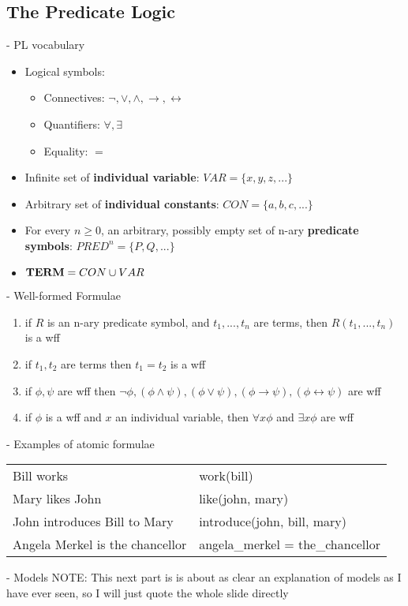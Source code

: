 \documentclass[11pt]{article}
\newenvironment{itemise}{
\begin{itemize}
  \setlength{\itemsep}{1pt}
  \setlength{\parskip}{0pt}
  \setlength{\parsep}{0pt}
}{\end{itemize}}
\begin{document}
\subsection{The Predicate Logic}
- PL vocabulary
\begin{itemise}
 \item Logical symbols:
\begin{itemise}
 \item Connectives: $\neg, \vee, \wedge, \rightarrow, \leftrightarrow$
 \item Quantifiers: $\forall, \exists$
 \item Equality: $=$
\end{itemise}
 \item Infinite set of {\bf individual variable}: $VAR = \{x, y, z, ...\}$
 \item Arbitrary set of {\bf individual constants}: $CON = \{a, b, c,...\}$
 \item For every $n \geq 0$, an arbitrary, possibly empty set of n-ary {\bf predicate symbols}: $PRED^n = \{P, Q, ...\}$ 
 \item ${\bf TERM} = CON \cup VAR$
\end{itemise}
- Well-formed Formulae
\begin{enumerate}
 \item if $R$ is an n-ary predicate symbol, and $t_1 , ..., t_n$ are terms, then $R(t_1 , ..., t_n )$ is a wff
 \item if $t_1 , t_2$ are terms then $t_1 = t_2$ is a wff
 \item if $\phi, \psi$ are wff then $\neg\phi, (\phi\wedge\psi), (\phi\vee\psi), (\phi\rightarrow\psi), (\phi\leftrightarrow\psi)$ are wff
 \item if $\phi$ is a wff and $x$ an individual variable, then $\forall x\phi$ and $\exists x\phi$ are wff
\end{enumerate}
- Examples of atomic formulae
\begin{center}
\begin{tabular}{ll}
Bill works & work(bill)\\
Mary likes John & like(john, mary)\\
John introduces Bill to Mary & introduce(john, bill, mary)\\
Angela Merkel is the chancellor & angela\_merkel = the\_chancellor
\end{tabular}
\end{center}
- Models 
NOTE: This next part is is about as clear an explanation of models as I have ever seen, so I will just quote the whole slide directly 
\end{document}
